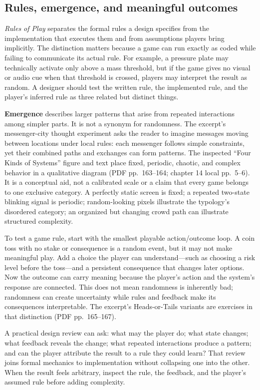 \subsection{Rules, emergence, and meaningful outcomes}\label{05-engine-i-ch009-rules-emergence-and-meaningful-outcomes}

\emph{Rules of Play} separates the formal rules a design specifies from the implementation that executes them and from assumptions players bring implicitly. The distinction matters because a game can run exactly as coded while failing to communicate its actual rule. For example, a pressure plate may technically activate only above a mass threshold, but if the game gives no visual or audio cue when that threshold is crossed, players may interpret the result as random. A designer should test the written rule, the implemented rule, and the player's inferred rule as three related but distinct things.

\textbf{Emergence} describes larger patterns that arise from repeated interactions among simpler parts. It is not a synonym for randomness. The excerpt's messenger-city thought experiment asks the reader to imagine messages moving between locations under local rules: each messenger follows simple constraints, yet their combined paths and exchanges can form patterns. The inspected ``Four Kinds of Systems'' figure and text place fixed, periodic, chaotic, and complex behavior in a qualitative diagram (PDF pp.~163--164; chapter 14 local pp.~5--6). It is a conceptual aid, not a calibrated scale or a claim that every game belongs to one exclusive category. A perfectly static screen is fixed; a repeated two-state blinking signal is periodic; random-looking pixels illustrate the typology's disordered category; an organized but changing crowd path can illustrate structured complexity.

To test a game rule, start with the smallest playable action/outcome loop. A coin toss with no stake or consequence is a random event, but it may not make meaningful play. Add a choice the player can understand---such as choosing a risk level before the toss---and a persistent consequence that changes later options. Now the outcome can carry meaning because the player's action and the system's response are connected. This does not mean randomness is inherently bad; randomness can create uncertainty while rules and feedback make its consequences interpretable. The excerpt's Heads-or-Tails variants are exercises in that distinction (PDF pp.~165--167).

A practical design review can ask: what may the player do; what state changes; what feedback reveals the change; what repeated interactions produce a pattern; and can the player attribute the result to a rule they could learn? That review joins formal mechanics to implementation without collapsing one into the other. When the result feels arbitrary, inspect the rule, the feedback, and the player's assumed rule before adding complexity.

